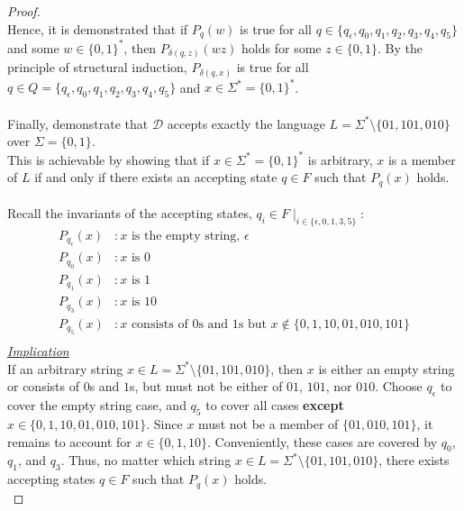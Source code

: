 \documentclass[12pt]{article}
\begin{document}
\begin{proof}
    \\
    Hence, it is demonstrated that if $P_q(w)$ is true for all $q \in \{q_{\epsilon}, q_0, q_1, q_2, q_3, q_4, q_5\}$ and some $w \in \{0, 1\}^*$, then $P_{\delta(q, z)}(wz)$ holds for some $z \in \{0, 1\}$. By the principle of structural induction, $P_{\delta(q, x)}$ is true for all $q \in Q = \{q_{\epsilon}, q_0, q_1, q_2, q_3, q_4, q_5\}$ and $x \in \Sigma^* = \{0, 1\}^*$. \\
    \\
    Finally, demonstrate that $\mathcal{D}$ accepts exactly the language $L = \Sigma^* \setminus \{01, 101, 010\}$ over $\Sigma = \{0, 1\}$. \\
    This is achievable by showing that if $x \in \Sigma^* = \{0, 1\}^*$ is arbitrary, $x$ is a member of $L$ if and only if there exists an accepting state $q \in F$ such that $P_q(x)$ holds. \\
    \\
    Recall the invariants of the accepting states, $q_i \in F \mid_{i \in \{\epsilon, 0, 1, 3, 5\}}$:
    \begin{equation*}
        \begin{aligned}
            P_{q_\epsilon}(x)&: \text{$x$ is the empty string, } \epsilon \\
            P_{q_0}(x)&: \text{$x$ is $0$} \\
            P_{q_1}(x)&: \text{$x$ is $1$} \\
            P_{q_3}(x)&: \text{$x$ is $10$} \\
            P_{q_5}(x)&: \text{$x$ consists of $0$s and $1$s but $x \notin \{0, 1, 10, 01, 010, 101\}$} \\
        \end{aligned}
    \end{equation*}
    \underline{\textit{Implication}} \\
    If an arbitrary string $x \in L = \Sigma^* \setminus \{01, 101, 010\}$, then $x$ is either an empty string or consists of $0$s and $1$s, but must not be either of $01$, $101$, nor $010$. Choose $q_{\epsilon}$ to cover the empty string case, and $q_5$ to cover all cases \textbf{except} $x \in \{0, 1, 10, 01, 010, 101\}$. Since $x$ must not be a member of $\{01, 010, 101\}$, it remains to account for $x \in \{0, 1, 10\}$. Conveniently, these cases are covered by $q_0$, $q_1$, and $q_3$. Thus, no matter which string $x \in L = \Sigma^* \setminus \{01, 101, 010\}$, there exists accepting states $q \in F$ such that $P_q(x)$ holds. \\

\end{proof}
\end{document}
